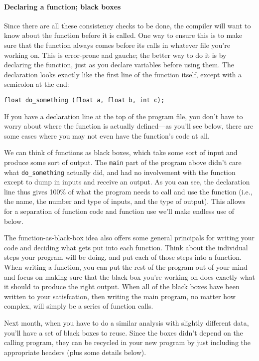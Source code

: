 \documentclass[12pt]{article}
\begin{document}
\paragraph{Declaring a function; black boxes} 
Since there are all these consistency
checks to be done, the compiler will want to know about the function
before it is called. One way to ensure this is to make sure that
the function always comes before its calls in whatever file you're
working on. This is error-prone and gauche; the better way to do it is
by declaring the function, just as you declare variables before using
them. The declaration looks exactly like the first line of the function
itself, except with a semicolon at the end:

\begin{verbatim}
float do_something (float a, float b, int c);
\end{verbatim}

If you have a declaration line at the top of the program file, you don't
have to worry about where the function is actually defined---as
you'll see below, there are some cases where you may not even have the
function's code at all. 

We can think of functions as black boxes, which take some sort of input and produce some sort of output.
The {\tt main} part of the program above didn't care what {\tt do\_something} actually did, and had no
involvement with the function except to dump in inputs and receive an output. As you can see, the
declaration line thus gives 100\% of what the program needs to call and use the function (i.e., the name,
the number and type of inputs, and the type of output). This allows for
a separation of function code and function use we'll make endless use of below.

The function-as-black-box idea also offers some general principals for
writing your code and deciding what gets put into each function. Think
about the individual steps your program will be doing, and put each
of those steps into a function. When writing a function, you
can put the rest of the program out of your mind and focus on making
sure that the black box you're working on does exactly what it should
to produce the right output. When all of the black boxes have been written to
your satisfcation, then writing the main program, no matter how complex,
will simply be a series of function calls.

Next month, when you have to do a similar analysis with slightly different
data, you'll have a set of black boxes to reuse. Since the boxes didn't
depend on the calling program, they can be recycled in your new program
by just including the appropriate headers (plus some details below).
\end{document}
